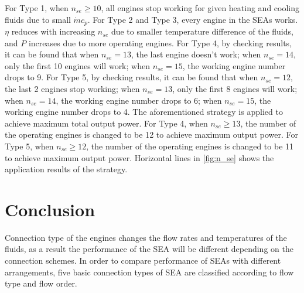For Type 1, when $n_{se} \geqslant 10$, all engines stop working for given heating and cooling fluids due to small $\dot{m}c_p$. For Type 2 and Type 3, every engine in the SEAs works. $\eta$ reduces with increasing $n_{se}$ due to smaller temperature difference of the fluids, and $P$ increases due to more operating engines. For Type 4, by checking results, it can be found that when $n_{se} = 13$,  the last engine doesn't work; when $n_{se} = 14$, only the first 10 engines will work; when $n_{se} = 15$, the working engine number drops to 9. For Type 5, by checking results, it can be found that when $n_{se} = 12$, the last 2 engines stop working; when $n_{se} = 13$, only the first 8 engines will work; when $n_{se} = 14$, the working engine number drops to 6; when $n_{se} = 15$, the working engine number drops to 4. The aforementioned strategy is applied to achieve maximum total output power. For Type 4, when $n_{se} \geqslant 13$, the number of the operating engines is changed to be 12 to achieve maximum output power. For Type 5, when $n_{se} \geqslant 12$, the number of the operating engines is changed to be 11 to achieve maximum output power.
Horizontal lines in \autoref{fig:n_se} shows the application results of the strategy. 

\section{Conclusion}

Connection type of the engines changes the flow rates and temperatures of the fluids, as a result the performance of the SEA will be different depending on the connection schemes. In order to compare performance of SEAs with different arrangements, five basic connection types of SEA are classified according to flow type and flow order. 


